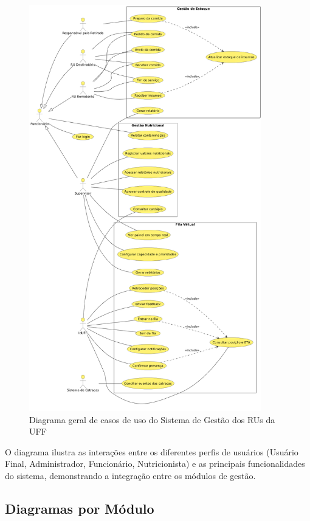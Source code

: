 \documentclass[12pt,a4paper]{article}
\begin{document}
\begin{figure}[htbp]
    \centering
    \includegraphics[width=0.9\textwidth]{diagramas/diagrama-geral.png}
    \caption{Diagrama geral de casos de uso do Sistema de Gestão dos RUs da UFF}
    \label{fig:diagrama_geral}
\end{figure}

O diagrama ilustra as interações entre os diferentes perfis de usuários (Usuário Final, Administrador, Funcionário, Nutricionista) e as principais funcionalidades do sistema, demonstrando a integração entre os módulos de gestão.

\subsection{Diagramas por Módulo}
\end{document}
